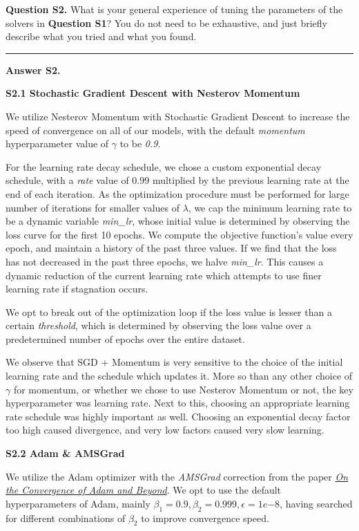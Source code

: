 \documentclass[11pt]{report}
\begin{document}
{\bf Question S2.}
What is your general experience of tuning the parameters of the solvers in {\bf Question S1}?
You do not need to be exhaustive, and just briefly describe what you tried and what you found.

\rule{\paperwidth}{0.6pt}
{\bf Answer S2.}
%

{\bf S2.1 Stochastic Gradient Descent with Nesterov Momentum}

We utilize Nesterov Momentum with Stochastic Gradient Descent to increase the speed of convergence on all of our models, with the default \textit{momentum} hyperparameter value of $\gamma$ to be \textit{0.9}. 

For the learning rate decay schedule, we chose a custom exponential decay schedule, with a \textit{rate} value of $0.99$ multiplied by the previous learning rate at the end of each iteration. As the optimization procedure must be performed for large number of iterations for smaller values of $\lambda$, we cap the minimum learning rate to be a dynamic variable \textit{min\_lr}, whose initial value is determined by observing the loss curve for the first 10 epochs. We compute the objective function's value every epoch, and maintain a history of the past three values. If we find that the loss has not decreased in the past three epochs, we halve \textit{min\_lr}. This causes a dynamic reduction of the current learning rate which attempts to use finer learning rate if stagnation occurs. 

We opt to break out of the optimization loop if the loss value is lesser than a certain \textit{threshold}, which is determined by observing the loss value over a predetermined number of epochs over the entire dataset.

We observe that SGD + Momentum is very sensitive to the choice of the initial learning rate and the schedule which updates it. More so than any other choice of $\gamma$ for momentum, or whether we chose to use Nesterov Momentum or not, the key hyperparameter was learning rate. Next to this, choosing an appropriate learning rate schedule was highly important as well. Choosing an exponential decay factor too high caused divergence, and very low factors caused very slow learning.

{\bf S2.2 Adam \& AMSGrad}

We utilize the Adam optimizer with the \textit{AMSGrad} correction from the paper \href{https://openreview.net/forum?id=ryQu7f-RZ}{\textit{On the Convergence of Adam and Beyond}}. We opt to use the default hyperparameters of Adam, mainly $\beta_1 = 0.9, \beta_2 = 0.999, \epsilon = 1e{-8}$, having searched for different combinations of $\beta_2$ to improve convergence speed.
\end{document}
